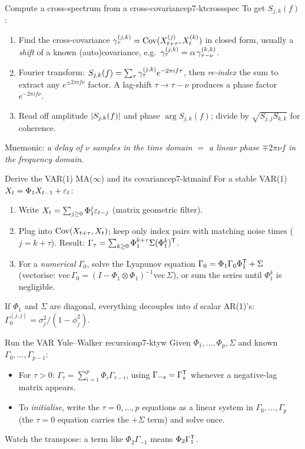 \begin{keytech}{Compute a cross-spectrum from a cross-covariance}{p7-ktcrossspec}
To get $S_{j,k}(f)$:
\begin{enumerate}
  \item Find the cross-covariance $\gamma_\tau^{(j,k)}=\operatorname{Cov}(X_{t+\tau}^{(j)},X_t^{(k)})$
        in closed form, usually a \emph{shift} of a known (auto)covariance, e.g.\
        $\gamma_\tau^{(j,k)}=\alpha\,\gamma_{\tau-\nu}^{(k,k)}$.
  \item Fourier transform: $S_{j,k}(f)=\sum_\tau\gamma_\tau^{(j,k)}e^{-2\pi if\tau}$,
        then \emph{re-index} the sum to extract any $e^{\pm2\pi if\nu}$ factor.
        A lag-shift $\tau\to\tau-\nu$ produces a phase factor $e^{-2\pi if\nu}$.
  \item Read off amplitude $\left\lvert S_{j,k}(f) \right\rvert$ and phase $\arg S_{j,k}(f)$; divide
        by $\sqrt{S_{j,j}S_{k,k}}$ for coherence.
\end{enumerate}
Mnemonic: \emph{a delay of $\nu$ samples in the time domain $=$ a linear phase
$\mp2\pi\nu f$ in the frequency domain}.
\end{keytech}

\begin{keytech}{Derive the VAR(1) MA($\infty$) and its covariance}{p7-ktmainf}
For a stable VAR(1) $X_t=\Phi_1 X_{t-1}+\varepsilon_t$:
\begin{enumerate}
  \item Write $X_t=\sum_{j\ge0}\Phi_1^j\varepsilon_{t-j}$ (matrix geometric filter).
  \item Plug into $\operatorname{Cov}(X_{t+\tau},X_t)$; keep only index pairs with matching
        noise times ($j=k+\tau$). Result:
        $\Gamma_\tau=\sum_{k\ge0}\Phi_1^{k+\tau}\Sigma(\Phi_1^k)^{\mathsf{T}}$.
  \item For a \emph{numerical} $\Gamma_0$, solve the Lyapunov equation
        $\Gamma_0=\Phi_1\Gamma_0\Phi_1^{\mathsf{T}}+\Sigma$ (vectorise:
        $\mathrm{vec}\,\Gamma_0=(I-\Phi_1\otimes\Phi_1)^{-1}\mathrm{vec}\,\Sigma$),
        or sum the series until $\Phi_1^k$ is negligible.
\end{enumerate}
If $\Phi_1$ and $\Sigma$ are diagonal, everything decouples into $d$ scalar
AR(1)'s: $\Gamma_0^{(j,j)}=\sigma_j^2/(1-\phi_j^2)$.
\end{keytech}

\begin{keytech}{Run the VAR Yule--Walker recursion}{p7-ktyw}
Given $\Phi_1,\dots,\Phi_p,\Sigma$ and known $\Gamma_0,\dots,\Gamma_{p-1}$:
\begin{itemize}
  \item For $\tau>0$: $\Gamma_\tau=\sum_{i=1}^p\Phi_i\Gamma_{\tau-i}$, using
        $\Gamma_{-s}=\Gamma_s^{\mathsf{T}}$ whenever a negative-lag matrix appears.
  \item To \emph{initialise}, write the $\tau=0,\dots,p$ equations as a linear
        system in $\Gamma_0,\dots,\Gamma_p$ (the $\tau=0$ equation carries the
        $+\Sigma$ term) and solve once.
\end{itemize}
Watch the transpose: a term like $\Phi_2\Gamma_{-1}$ means $\Phi_2\Gamma_1^{\mathsf{T}}$.
\end{keytech}


